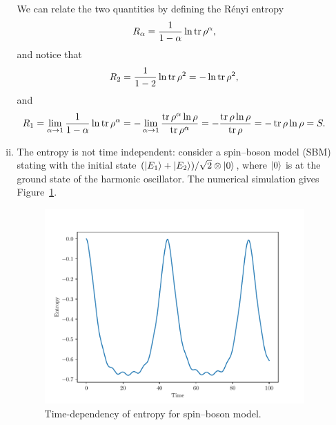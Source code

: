 \documentclass{article}
\begin{document}
\begin{enumerate}[1.]
\begin{enumerate}[(i)]
    We can relate the two quantities by defining the R\'enyi entropy
    \begin{align*}
      R_\alpha = \frac{1}{1-\alpha}\ln \tr\rho^\alpha,
    \end{align*}
    and notice that
    \begin{align*}
      R_2 = \frac{1}{1-2}\ln \tr\rho^2 = -\ln \tr\rho^2,
    \end{align*}
    and
    \begin{align*}
      R_1 = \lim_{\alpha \to 1} \frac{1}{1-\alpha}\ln \tr\rho^\alpha = - \lim_{\alpha \to 1} \frac{ \tr \rho^{\alpha}\ln \rho}{\tr \rho^\alpha} = - \frac{ \tr \rho\ln\rho}{\tr \rho} = -  \tr \rho\ln\rho= S.
    \end{align*}
    \item The entropy is not time independent: consider a spin--boson model (SBM) stating with the initial state $\qty(\ket{E_1} + \ket{E_2})/\sqrt{2}\otimes\ket{0}$, where $\ket{0}$ is at the ground state of the harmonic oscillator. The numerical simulation gives Figure~\ref{fig:q4-ce}.
    \begin{figure}[H]
      \centering
      \includegraphics[width=0.6\linewidth]{q4-ce.pdf}
      \caption{Time-dependency of entropy for spin--boson model.}
      \label{fig:q4-ce}
    \end{figure}
  \end{enumerate}


\end{enumerate}
\end{document}
